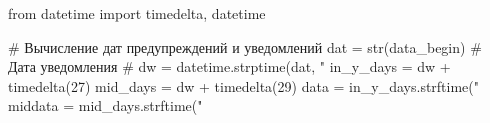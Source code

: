 \begin{pycode}	
from datetime import timedelta, datetime

# Вычисление дат предупреждений и уведомлений
dat = str(data_begin)                      # Дата уведомления
# 
dw = datetime.strptime(dat, "%
in_y_days = dw + timedelta(27)
mid_days = dw + timedelta(29)
data = in_y_days.strftime("%
middata = mid_days.strftime("%

\end{pycode}
